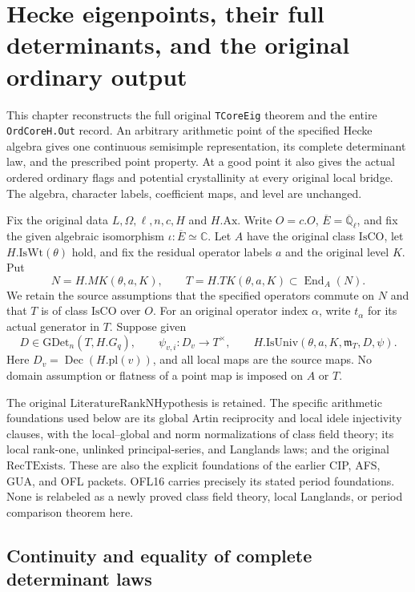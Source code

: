 \section{Hecke eigenpoints, their full determinants, and the original ordinary output}
\label{sec:hecke-eigenpoints-v44}

This chapter reconstructs the full original \texttt{TCoreEig} theorem
and the entire \texttt{OrdCoreH.Out} record.  An arbitrary arithmetic
point of the specified Hecke algebra gives one continuous semisimple
representation, its complete determinant law, and the prescribed point
property.  At a good point it also gives the actual ordered ordinary
flags and potential crystallinity at every original local bridge.
The algebra, character labels, coefficient maps, and level are unchanged.

Fix the original data $L,\Omega,\ell,n,c,H$ and $H.\mathrm{Ax}$.
Write $O=c.O$, $\overline E=\overline{\mathbb Q}_\ell$, and fix the
given algebraic isomorphism $\iota:\overline E\simeq\mathbb C$.
Let $A$ have the original class $\mathrm{IsCO}$, let
$H.\mathrm{IsWt}(\theta)$ hold, and fix the residual operator labels
$a$ and the original level $K$.  Put
\[
 N=H.MK(\theta,a,K),\qquad T=H.TK(\theta,a,K)
       \subset\operatorname{End}_A(N).
 \tag{HEP.1}
\]
We retain the source assumptions that the specified operators commute
on $N$ and that $T$ is of class $\mathrm{IsCO}$ over $O$.
For an original operator index $\alpha$, write $t_\alpha$ for its
actual generator in $T$.  Suppose given
\[
 D\in\mathrm{GDet}_n(T,H.G_q),\qquad
 \psi_{v,i}:D_v\longrightarrow T^\times,
 \qquad H.\mathrm{IsUniv}(\theta,a,K,\mathfrak m_T,D,\psi).
 \tag{HEP.2}
\]
Here $D_v=\operatorname{Dec}(H.\mathrm{pl}(v))$, and all local maps
are the source maps.  No domain assumption or flatness of a point
map is imposed on $A$ or $T$.

The original $\mathrm{LiteratureRankNHypothesis}$ is retained.
The specific arithmetic foundations used below are its global Artin
reciprocity and local idele injectivity clauses, with the local--global
and norm normalizations of class field theory; its local rank-one,
unlinked principal-series, and Langlands laws; and the original
$\mathrm{RecTExists}$.  These are also the explicit foundations of
the earlier CIP, AFS, GUA, and OFL packets.  OFL16 carries precisely
its stated period foundations.  None is relabeled as a newly proved
class field theory, local Langlands, or period comparison theorem here.

\subsection{Continuity and equality of complete determinant laws}

